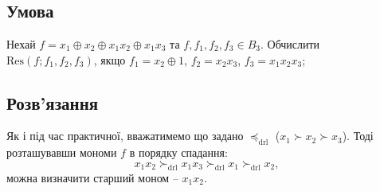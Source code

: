 \chapter{}
\label{chap:2}

\section{Умова}
Нехай $f = x_{1} \oplus x_{2} \oplus x_{1}x_{2} \oplus x_{1}x_{3}$ та $f, f_{1}, f_{2}, f_{3} \in B_{3}$. Обчислити
$\text{Res} (f; f_{1}, f_{2}, f_{3})$, якщо $f_{1} = x_{2} \oplus 1$, $f_{2} = x_{2}x_{3}$, $f_{3} = x_{1}x_{2}x_{3}$;

\section{Розв'язання}

Як і під час практичної, вважатимемо що задано $\preceq_{\mathrm{drl}}$ ($x_1 \succ x_2 \succ x_3$). Тоді
розташувавши мономи $f$ в порядку спадання:
\begin{equation*}
    x_1 x_2 \succ_{\mathrm{drl}} x_1 x_3 \succ_{\mathrm{drl}} x_1 \succ_{\mathrm{drl}} x_2,
\end{equation*}
можна визначити старший моном  -- $x_1 x_2$.

